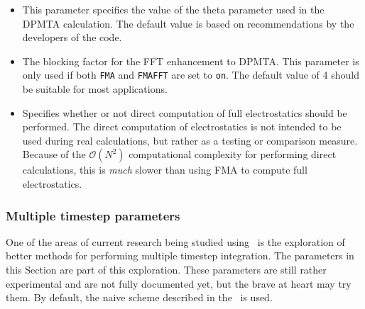 \begin{itemize}
\item
{}
{This parameter specifies the value of the theta parameter
used in the DPMTA calculation.  The default value is based on
recommendations by the developers of the code.}

\item
{}
{The blocking factor for the FFT enhancement to DPMTA.
This parameter is only used if both \verb!FMA! and \verb!FMAFFT! 
are set to \verb!on!.  The default value of 4 should be suitable
for most applications.}

\item
{}
{Specifies whether or not direct computation of 
full electrostatics should be performed.  
The direct computation of electrostatics 
is not intended to be used during 
real calculations, but rather as a testing or 
comparison measure.  Because of the ${\mathcal O}(N^2)$ 
computational complexity for performing 
direct calculations, this is {\it much} 
slower than using FMA to compute full 
electrostatics.}

\end{itemize}

\subsubsection{Multiple timestep parameters}

One of the areas of current research being studied using \NAMD\ is the
exploration of better methods for performing multiple timestep integration.
The parameters in this Section are part of this exploration.  These parameters
are still rather experimental and are not fully documented yet, but the
brave at heart may try them.  By default, the naive scheme described
in the \PG\ is used.

